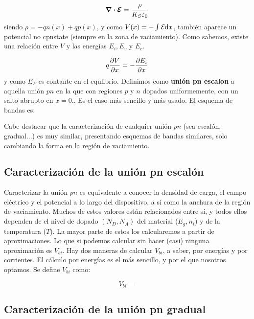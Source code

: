 \begin{equation}
    \div \boldsymbol{\mathcal{E}} = \frac{\rho}{K_S \varepsilon_0}
\end{equation}
siendo $\rho=-qn(x)+qp(x)$, y como $V(x)=-\int \mathcal{E} \mathrm{d} x$, también aparece un potencial no cpnstate (siempre en la zona de vaciamiento). Como sabemos, existe una relación entre $V$ y las energías $E_i,E_v$ y $E_c$. 

\begin{equation*}
    q \frac{\partial V}{\partial x} = - \frac{\partial E_i}{\partial x}
\end{equation*}
y como $E_F$ es contante en el equlibrio. Definimos como \textbf{unión pn escalon} a aquella unión $pn$ en la que con regiones $p$ y $n$ dopados uniformemente, con un salto abrupto en $x=0$.. Es el caso más sencillo y más usado. El esquema de bandas es:


Cabe destacar que la caracterización de cualquier unión $pn$ (sea escalón, gradual...) es muy similar, presentando esquemas de bandas similares, solo cambiando la forma en la región de vaciamiento.


\subsection{Caracterización de la unión pn escalón}
Caracterizar la unión $pn$ es equivalente a conocer la densidad de carga, el campo eléctrico y el potencial a lo largo del dispositivo, a sí como la anchura de la región de vaciamiento. Muchos de estos valores están relacionados entre sí, y todos ellos dependen de el nivel de dopado $(N_D,N_A)$ del material ($E_g,n_i$) y de la temperatura ($T$). La mayor parte de estos los calcularemos a partir de aproximaciones. Lo que si podemos calcular sin hacer (casi) ninguna aproximación es $V_{bi}$. Hay dos maneras de calcular $V_{bi}$, a saber, por energías y por corrientes. El cálculo por energías es el más sencillo, y por el que nosotros optamos. Se define $V_{bi}$ como:



\begin{equation}
    V_{bi}= 
\end{equation}

\subsection{Caracterización de la unión pn gradual}




